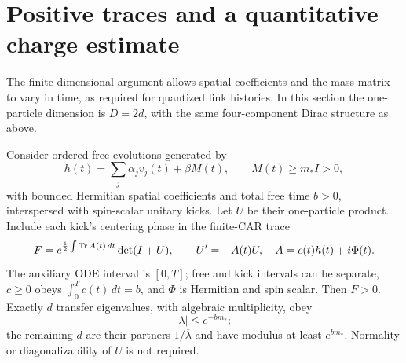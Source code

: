\section{Positive traces and a quantitative charge estimate}
\label{sec:transfer}

The finite-dimensional argument allows spatial coefficients and
the mass matrix to vary in time, as required for quantized link
histories. In this section the one-particle dimension is $D=2d$,
with the same four-component Dirac structure as above.

\begin{lemma}
\label{lem:transfer}
Consider ordered free evolutions generated by
\[
 h(t)=\sum_j\alpha_jv_j(t)+\beta M(t),\qquad M(t)\ge m_*I>0,
\]
with bounded Hermitian spatial coefficients and total free time
$b>0$, interspersed with spin-scalar unitary kicks.
Let $U$ be their one-particle product. Include each kick's
centering phase in the finite-CAR trace
\begin{equation}
 F=e^{\frac12\int\operatorname{Tr} A(t)\,dt}\det(I+U),
 \qquad U'=-A(t)U,\quad A=c(t)h(t)+i\Phi(t).
 \label{eq:centered-trace}
\end{equation}
The auxiliary ODE interval is $[0,T]$; free and kick intervals
can be separate, $c\ge0$ obeys $\int_0^Tc(t)\,dt=b$, and
$\Phi$ is Hermitian and spin scalar.
Then $F>0$. Exactly $d$ transfer eigenvalues, with algebraic
multiplicity, obey
\begin{equation}
 |\lambda|\le e^{-bm_*};
 \label{eq:annulus}
\end{equation}
the remaining $d$ are their partners $1/\overline\lambda$ and
have modulus at least $e^{bm_*}$. Normality or diagonalizability
of $U$ is not required.
\end{lemma}
